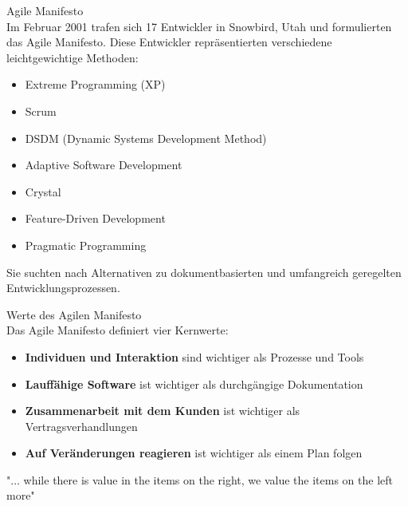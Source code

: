 \begin{concept}{Agile Manifesto}\\
    Im Februar 2001 trafen sich 17 Entwickler in Snowbird, Utah und formulierten das Agile Manifesto. Diese Entwickler repräsentierten verschiedene leichtgewichtige Methoden:
    \begin{itemize}
        \item Extreme Programming (XP)
        \item Scrum
        \item DSDM (Dynamic Systems Development Method)
        \item Adaptive Software Development
        \item Crystal
        \item Feature-Driven Development
        \item Pragmatic Programming
    \end{itemize}
    Sie suchten nach Alternativen zu dokumentbasierten und umfangreich geregelten Entwicklungsprozessen.
\end{concept}

\begin{definition}{Werte des Agilen Manifesto}\\
    Das Agile Manifesto definiert vier Kernwerte:
    \begin{itemize}
        \item \textbf{Individuen und Interaktion} sind wichtiger als Prozesse und Tools
        \item \textbf{Lauffähige Software} ist wichtiger als durchgängige Dokumentation
        \item \textbf{Zusammenarbeit mit dem Kunden} ist wichtiger als Vertragsverhandlungen
        \item \textbf{Auf Veränderungen reagieren} ist wichtiger als einem Plan folgen
    \end{itemize}
    "... while there is value in the items on the right, we value the items on the left more"
\end{definition}


